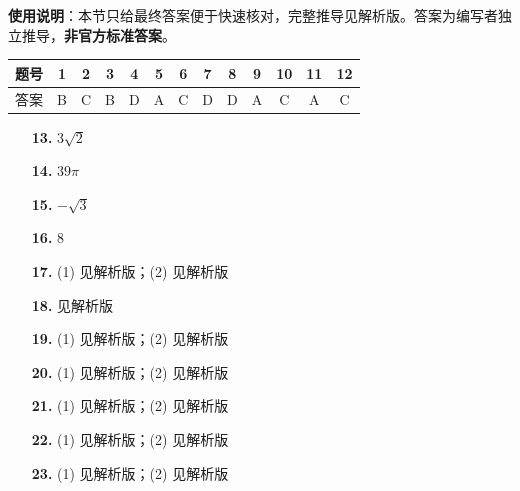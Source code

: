 
\begin{gknotice}
\textbf{使用说明}：本节只给最终答案便于快速核对，完整推导见解析版。答案为编写者独立推导，\textbf{非官方标准答案}。
\end{gknotice}

\begin{center}\begin{tabular}{ccccccccccccc}
\toprule
题号 & 1 & 2 & 3 & 4 & 5 & 6 & 7 & 8 & 9 & 10 & 11 & 12 \\
\midrule
答案 & B & C & B & D & A & C & D & D & A & C & A & C \\
\bottomrule
\end{tabular}\end{center}

\begin{itemize}[leftmargin=2.6em]
  \item[\textbf{13.}] $3\sqrt2$
  \item[\textbf{14.}] $39\pi$
  \item[\textbf{15.}] $-\sqrt3$
  \item[\textbf{16.}] $8$
\end{itemize}

\begin{itemize}[leftmargin=2.6em]
  \item[\textbf{17.}] (1) 见解析版；(2) 见解析版
  \item[\textbf{18.}] 见解析版
  \item[\textbf{19.}] (1) 见解析版；(2) 见解析版
  \item[\textbf{20.}] (1) 见解析版；(2) 见解析版
  \item[\textbf{21.}] (1) 见解析版；(2) 见解析版
\end{itemize}

\begin{itemize}[leftmargin=2.6em]
  \item[\textbf{22.}] (1) 见解析版；(2) 见解析版
  \item[\textbf{23.}] (1) 见解析版；(2) 见解析版
\end{itemize}
